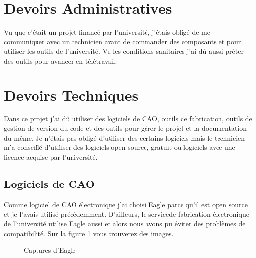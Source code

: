 \documentclass[12pt]{article}
\begin{document}
\section{Devoirs Administratives}
Vu que c'était un projet financé par l'université, j'étais obligé de me communiquer avec un technicien avant de commander des composants et pour utiliser les outils de l'université. Vu les conditions sanitaires j'ai dû aussi prêter des outils pour avancer en télétravail.

\section{Devoirs Techniques}
\begin{par}
	Dans ce projet j'ai dû utiliser des logiciels de CAO, outils de fabrication, outils de gestion de version du code et des outils pour gérer le projet et la documentation du même. Je n'étais pas obligé d'utiliser des certains logiciels mais le technicien m'a conseillé d'utiliser des logiciels open source, gratuit ou logiciels avec une licence acquise par l'université.
\end{par}
\subsection{Logiciels de CAO}

\begin{par}
Comme logiciel de CAO électronique j'ai choisi Eagle parce qu'il est open source et je l'avais utilisé précédemment. D'ailleurs, le servicede fabrication électronique de l'université utilise Eagle aussi et alors nous avons pu éviter des problèmes de compatibilité. Sur la figure \ref{img:eagle_all} vous trouverez des images.
\end{par}
\begin{figure}[!htb]
	\centering
	\caption{Captures d'Eagle}
	\label{img:eagle_all}
\end{figure}
\end{document}
